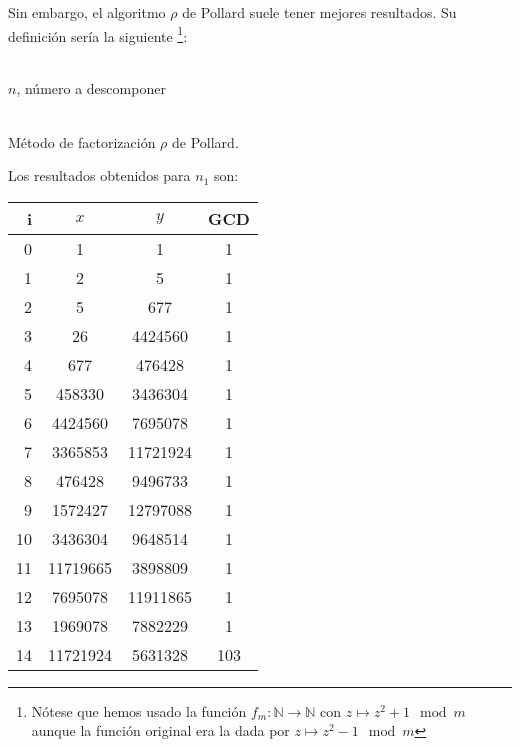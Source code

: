 \begin{enumerate}
\begin{enumerate}
			Sin embargo, el algoritmo $\rho$ de Pollard suele tener mejores resultados. Su definición sería la
			siguiente \footnote{Nótese que hemos usado la función $f_m: \mathbb{N} \rightarrow \mathbb{N}$
			con $z \mapsto z^2+1 \mod{m}$ aunque la función original era la dada por $z \mapsto z^2-1 \mod{m}$}:
			\begin{algorithm}[H]
			\begin{algorithmic}[1]
				\REQUIRE \ \\
					\texttt{$n$}, número a descomponer \\ \
				\ENDWHILE
				\ELSE
				\ENDIF
			\end{algorithmic}
			\caption{Método de factorización $\rho$ de Pollard.}
			\label{Rho-Pollard}
			\end{algorithm}
			
			Los resultados obtenidos para $n_1$ son:
			\begin{center}
			\begin{tabular}{ | r | c | c | c |}
				\hline
				i   & $x$       & $y$       & GCD \\
				\hline
				0   & 1         & 1         & 1 \\
				1   & 2         & 5         & 1 \\
				2   & 5         & 677       & 1 \\
				3   & 26        & 4424560   & 1 \\
				4   & 677       & 476428    & 1 \\
				5   & 458330    & 3436304   & 1 \\
				6   & 4424560   & 7695078   & 1 \\
				7   & 3365853   & 11721924  & 1 \\
				8   & 476428    & 9496733   & 1 \\
				9   & 1572427   & 12797088  & 1 \\
				10  & 3436304   & 9648514   & 1 \\
				11  & 11719665  & 3898809   & 1 \\
				12  & 7695078   & 11911865  & 1 \\
				13  & 1969078   & 7882229   & 1 \\
				14  & 11721924  & 5631328   & 103 \\
				\hline
			\end{tabular}
			\end{center}


\end{enumerate}
\end{enumerate}
